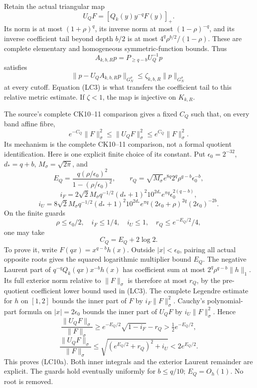 \documentclass[10pt]{article}
\begin{document}
Retain the actual triangular map \[
 U_QF=[Q_k(y)y^{-q}F(y)]_+.
\tag{LC8}
\] Its norm is at most \((1+\rho)^q\), its inverse norm at most \((1-\rho)^{-q}\), and its inverse coefficient tail beyond depth \(b/2\) is at most \(4^q\rho^{b/2}/(1-\rho)\). These are complete elementary and homogeneous symmetric-function bounds. Thus \[
 A_{k,b,R}p=P_{\ge q-b}U_Q^{-1}p
\] satisfies \[
 \boxed{\|p-U_QA_{k,b,R}p\|_{G_N^\sigma}
 \le\zeta_{k,b,R}\|p\|_{G_N^\sigma}}
 \tag{LC9}
\] at every cutoff. Equation (LC3) is what transfers the coefficient tail to this relative metric estimate. If \(\zeta<1\), the map is injective on \(K_{k,R}\).

The source's complete CK10--11 comparison gives a fixed \(C_Q\) such that, on every band affine fibre, \[
 e^{-C_Q}\|F\|_\sigma^2\le\|U_QF\|_\sigma^2\le e^{C_Q}\|F\|_\sigma^2.
 \tag{LC10}
\] Its mechanism is the complete CK10--11 comparison, not a formal quotient identification. Here is one explicit finite choice of its constant. Put \(\epsilon_0=2^{-32}\), \(d_*=q+b\), \(M_\sigma=\sqrt{2\pi}\), and \[
 E_Q=\frac{q(\rho/\epsilon_0)^2}{1-(\rho/\epsilon_0)^2},\qquad
 r_Q=\sqrt{M_\sigma}e^{8q}2^q\rho^{q-b}\epsilon_0^{-b},
\] \[
 i_F=2\sqrt2M_\sigma q^{-1/2}(d_*+1)^2 10^{2d_*}
 e^{\pi q}\epsilon_0^{2(q-b)},
\] \[
 i_U=8\sqrt2M_\sigma q^{-1/2}(d_*+1)^2 10^{2d_*}
 e^{\pi q}(2\epsilon_0+\rho)^{2q}(2\epsilon_0)^{-2b}.
\] On the finite guards \[
 \rho\le\epsilon_0/2,\quad i_F\le1/4,\quad i_U\le1,
 \quad r_Q\le e^{-E_Q/2}/4,
\] one may take \[
 \boxed{C_Q=E_Q+2\log2.} \tag{LC10a}
\] To prove it, write \(F(qx)=x^{q-b}h(x)\). Outside \(|x|<\epsilon_0\), pairing all actual opposite roots gives the squared logarithmic multiplier bound \(E_Q\). The negative Laurent part of \(q^{-q}Q_k(qx)x^{-b}h(x)\) has coefficient sum at most \(2^q\rho^{q-b}\|h\|_1\). Its full exterior norm relative to \(\|F\|_\sigma\) is therefore at most \(r_Q\), by the pre-quotient coefficient lower bound used in (LC3). The complete Legendre estimate for \(h\) on \([1,2]\) bounds the inner part of \(F\) by \(i_F\|F\|_\sigma^2\). Cauchy's polynomial-part formula on \(|x|=2\epsilon_0\) bounds the inner part of \(U_QF\) by \(i_U\|F\|_\sigma^2\). Hence \[
 \frac{\|U_QF\|_\sigma}{\|F\|_\sigma}
 \ge e^{-E_Q/2}\sqrt{1-i_F}-r_Q>\tfrac12e^{-E_Q/2},
\] \[
 \frac{\|U_QF\|_\sigma}{\|F\|_\sigma}
 \le\sqrt{(e^{E_Q/2}+r_Q)^2+i_U}<2e^{E_Q/2}.
\] This proves (LC10a). Both inner integrals and the exterior Laurent remainder are explicit. The guards hold eventually uniformly for \(b\le q/10\); \(E_Q=O_h(1)\). No root is removed.
\end{document}
